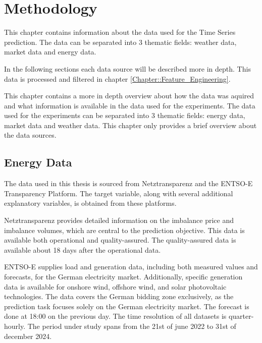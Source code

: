 \documentclass[class=scrbook, crop=false]{standalone}
\begin{document}
\chapter{Methodology} %
\label{Chapter::Methodology}
This chapter contains information about the data used for the Time Series prediction. 
The data can be separated into 3 thematic fields: weather data, market data and energy data.

In the following sections each data source will be described more in depth. 
This data is processed and filtered in chapter \ref{Chapter::Feature_Engineering}.

This chapter contains a more in depth overview about how the data was aquired and what information is available in the data used for the experiments. 
The data used for the experiments can be separated into 3 thematic fields: energy data, market data and weather data.
This chapter only provides a brief overview about the data sources. 

    
\section{Energy Data}
\label{Section::Energy_Data}


The data used in this thesis is sourced from Netztransparenz and the ENTSO-E Transparency Platform.
The target variable, along with several additional explanatory variables, is obtained from these platforms.

Netztransparenz provides detailed information on the imbalance price and imbalance volumes, which are central to the prediction objective.
This data is available both operational and quality-assured.
The quality-assured data is available about 18 days after the operational data. 

ENTSO-E supplies load and generation data, including both measured values and forecasts, for the German electricity market.
Additionally, specific generation data is available for onshore wind, offshore wind, and solar photovoltaic technologies.
The data covers the German bidding zone exclusively, as the prediction task focuses solely on the German electricity market.
The forecast is done at 18:00 on the previous day. 
The time resolution of all datasets is quarter-hourly.
The period under study spans from the 21st of june 2022 to 31st of december 2024.
\end{document}
